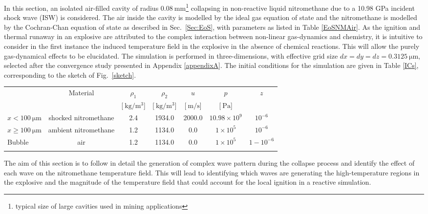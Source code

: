 \documentclass[3p,times,twocolumn]{elsarticle}
\begin{document}
In this section, an isolated air-filled cavity of radius $\SI{0.08}{\milli \meter}$\footnote{typical size of large cavities used in mining applications} collapsing in non-reactive liquid nitromethane due to a 10.98 GPa incident shock wave (ISW) is
considered. The air inside the cavity is modelled by the ideal gas equation of
state and the nitromethane is modelled by the Cochran-Chan equation of state as described in Sec.\ \ref{Sec:EoS}, with parameters as listed in Table \ref{EoSNMAir}. As the ignition and thermal runaway in an explosive are attributed to the complex interaction between non-linear gas-dynamics and chemistry, it is intuitive to consider in the first instance the induced temperature field in the explosive in the absence of chemical reactions. This will allow the purely gas-dynamical effects to be elucidated. The simulation is performed in three-dimensions, with effective grid size $dx=dy=dz=\SI{0.3125}{\micro \meter}$, 
selected after the convergence study presented in Appendix \ref{appendixA}. 
The initial conditions for the simulation are given in Table \ref{ICs}, corresponding to the sketch of Fig.\ \ref{sketch}.

\begin{table*}[!t]
\centering
\caption {Initial conditions for the shock-induced cavity collapse in inert nitromethane considered in this work}
\label{ICs}
\begin{tabular}{lcccccc}
\hline\noalign{\smallskip}
 & Material & $\rho_1$ & $\rho_{2}$ & $u$ & $p$  & $z$  \\
 & & [$\SI{}{\kilogram \per \meter \tothe{3}}$]& [$\SI{}{\kilogram \per \meter \tothe{3}}$] & [$\SI{}{\meter \per \second}$] & [$\SI{}{\pascal}$] &  \\
\noalign{\smallskip}\hline\noalign{\smallskip}
$x<100\SI{}{\micro \meter}$ & shocked nitromethane & 2.4 & 1934.0 & 2000.0 & $10.98\times10^{9}$ & $10^{-6}$ \\
$x\ge 100\SI{}{\micro \meter}$  & ambient nitromethane & 1.2 & 1134.0 & 0.0 & $1\times10^{5}$ & $10^{-6}$ \\
 Bubble & air &1.2 & 1134.0 & 0.0 &  $1\times10^{5}$ & $1-10^{-6}$ \\
\noalign{\smallskip}\hline
\end{tabular}
\end{table*}


The aim of this section is to follow in detail the generation of complex wave pattern during the collapse process and identify the effect of each wave on the nitromethane temperature field. This will lead to identifying which waves are generating the high-temperature regions in the explosive and the magnitude of the temperature field that could account for the local ignition in a reactive simulation.
\end{document}

